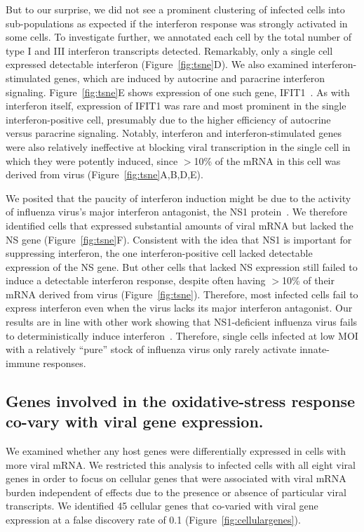 \documentclass[9pt,lineno]{elife}
\begin{document}
But to our surprise, we did not see a prominent clustering of infected cells into sub-populations as expected if the interferon response was strongly activated in some cells.
To investigate further, we annotated each cell by the total number of type I and III interferon transcripts detected.
Remarkably, only a single cell expressed detectable interferon (Figure~\ref{fig:tsne}D).
We also examined interferon-stimulated genes, which are induced by autocrine and paracrine interferon signaling.
Figure~\ref{fig:tsne}E shows expression of one such gene, IFIT1~\citep{Fensterl:2011fp}.
As with interferon itself, expression of IFIT1 was rare and most prominent in the single interferon-positive cell, presumably due to the higher efficiency of autocrine versus paracrine signaling.
Notably, interferon and interferon-stimulated genes were also relatively ineffective at blocking viral transcription in the single cell in which they were potently induced, since $>$10\% of the mRNA in this cell was derived from virus (Figure~\ref{fig:tsne}A,B,D,E).

We posited that the paucity of interferon induction might be due to the activity of influenza virus's major interferon antagonist, the NS1 protein~\citep{garcia1998influenza,hale2008multifunctional}.
We therefore identified cells that expressed substantial amounts of viral mRNA but lacked the NS gene (Figure~\ref{fig:tsne}F).
Consistent with the idea that NS1 is important for suppressing interferon, the one interferon-positive cell lacked detectable expression of the NS gene.
But other cells that lacked NS expression still failed to induce a detectable interferon response, despite often having $>$10\% of their mRNA derived from virus (Figure~\ref{fig:tsne}).
Therefore, most infected cells fail to express interferon even when the virus lacks its major interferon antagonist.
Our results are in line with other work showing that NS1-deficient influenza virus fails to deterministically induce interferon~\citep{Killip:2017ef,Kallfass:2013kp}.
Therefore, single cells infected at low MOI with a relatively ``pure'' stock of influenza virus only rarely activate innate-immune responses.

\subsection{Genes involved in the oxidative-stress response co-vary with viral gene expression.}
We examined whether any host genes were differentially expressed in cells with more viral mRNA.
We restricted this analysis to infected cells with all eight viral genes in order to focus on cellular genes that were associated with viral mRNA burden independent of effects due to the presence or absence of particular viral transcripts.
We identified 45 cellular genes that co-varied with viral gene expression at a false discovery rate of 0.1 (Figure~\ref{fig:cellulargenes}).
\end{document}
